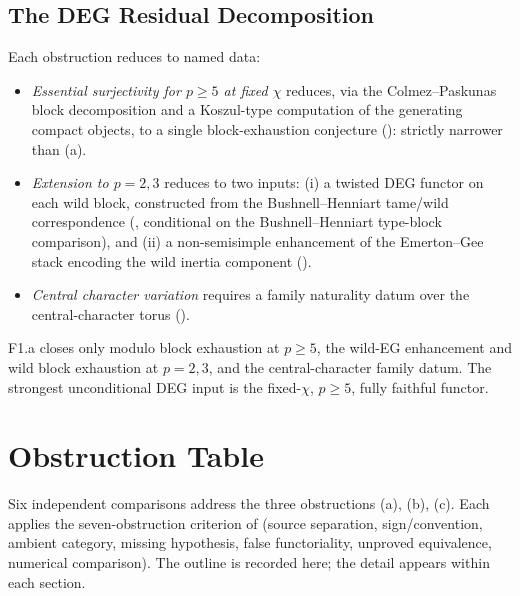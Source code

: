 \subsection{The DEG Residual Decomposition}

Each obstruction reduces to named data:
\begin{itemize}
\item[(a)] \emph{Essential surjectivity for \(p\geq 5\) at fixed
\(\chi\)} reduces, via the Colmez--Paskunas block decomposition and a
Koszul-type computation of the generating compact objects, to a
single block-exhaustion conjecture
(): strictly narrower
than (a).
\item[(b)] \emph{Extension to \(p=2,3\)} reduces to two inputs: (i) a
twisted DEG functor on each wild block, constructed from the
Bushnell--Henniart tame/wild correspondence
(, conditional on
the Bushnell--Henniart type-block comparison), and (ii) a non-semisimple
enhancement of the Emerton--Gee stack encoding the wild inertia
component ().
\item[(c)] \emph{Central character variation} requires a family
naturality datum over the central-character torus
().
\end{itemize}

F1.a closes only modulo block exhaustion at \(p\geq 5\), the wild-EG
enhancement and wild block exhaustion at \(p=2,3\), and the
central-character family datum.  The strongest unconditional DEG
input is the fixed-\(\chi\), \(p\geq 5\), fully faithful functor.

\section{Obstruction Table}
\label{v4-arith:deg-f1a:table}

Six independent comparisons address the three obstructions
(a), (b), (c). Each applies the seven-obstruction criterion of 
(source separation, sign/convention, ambient category, missing
hypothesis, false functoriality, unproved equivalence,
numerical comparison). The outline is recorded here; the detail
appears within each section.

